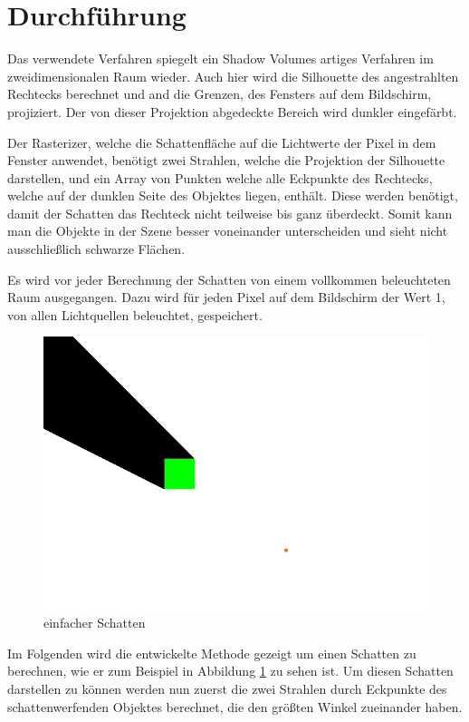 \section{Durchführung}

Das verwendete Verfahren spiegelt ein Shadow Volumes artiges Verfahren im zweidimensionalen
Raum wieder. Auch hier wird die Silhouette des angestrahlten Rechtecks berechnet und and die
Grenzen, des Fensters auf dem Bildschirm, projiziert. Der von dieser Projektion abgedeckte
Bereich wird dunkler eingefärbt.

Der Rasterizer, welche die Schattenfläche auf die Lichtwerte der Pixel in dem Fenster anwendet,
benötigt zwei Strahlen, welche die Projektion der Silhouette darstellen, und ein Array von
Punkten welche alle Eckpunkte des Rechtecks, welche auf der dunklen Seite des Objektes liegen,
enthält. Diese werden benötigt, damit der Schatten das Rechteck nicht teilweise bis ganz
überdeckt. Somit kann man die Objekte in der Szene besser voneinander unterscheiden und sieht
nicht ausschließlich schwarze Flächen.

Es wird vor jeder Berechnung der Schatten von einem vollkommen beleuchteten Raum ausgegangen.
Dazu wird für jeden Pixel auf dem Bildschirm der Wert 1, von allen Lichtquellen beleuchtet,
gespeichert.

\begin{figure}[t]
	\centering
	\includegraphics[width=\columnwidth]{images/durchfuehrung.png}
	\caption{einfacher Schatten}
	\label{fig:durch1}
\end{figure}

Im Folgenden wird die entwickelte Methode gezeigt um einen Schatten zu berechnen, wie er zum
Beispiel in Abbildung \ref{fig:durch1} zu sehen ist. Um diesen Schatten darstellen zu können
werden nun zuerst die zwei Strahlen durch Eckpunkte des schattenwerfenden Objektes berechnet,
die den größten Winkel zueinander haben.

